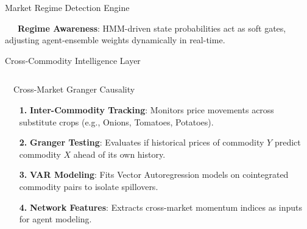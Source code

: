 \documentclass{beamer}
\begin{document}
\begin{frame}{Market Regime Detection Engine}
\vspace{0.15cm}
\begin{tcolorbox}[enhanced, colback=primaryblue!4, colframe=primaryblue!30, boxrule=0.35pt,
  arc=3.5pt, width=0.98\textwidth, left=4pt, right=4pt, top=2.5pt, bottom=2.5pt, boxsep=0pt,
  halign=center, shadow={0.5pt}{-0.5pt}{0pt}{black!8}]
    \fontsize{5.5pt}{6.5pt}\selectfont
    \textcolor{primaryDark}{~~~\textbf{Regime Awareness}: HMM-driven state probabilities act as soft gates, adjusting agent-ensemble weights dynamically in real-time.}
\end{tcolorbox}
\end{frame}

\begin{frame}{Cross-Commodity Intelligence Layer}
\vspace{-0.2cm}

\begin{columns}[T]
    \begin{column}{0.48\textwidth}
        \begin{infocard}{~~Cross-Market Granger Causality}
            \fontsize{6.8pt}{8.5pt}\selectfont
            \begin{enumerate}\setlength\itemsep{3.5pt}\setlength\parskip{0pt}
                \item[\textbf{1.}] \textbf{Inter-Commodity Tracking}: Monitors price movements across substitute crops (e.g., Onions, Tomatoes, Potatoes).
                \item[\textbf{2.}] \textbf{Granger Testing}: Evaluates if historical prices of commodity $Y$ predict commodity $X$ ahead of its own history.
                \item[\textbf{3.}] \textbf{VAR Modeling}: Fits Vector Autoregression models on cointegrated commodity pairs to isolate spillovers.
                \item[\textbf{4.}] \textbf{Network Features}: Extracts cross-market momentum indices as inputs for agent modeling.
            \end{enumerate}
        \end{infocard}
    \end{column}
    

\end{columns}
\end{frame}
\end{document}
